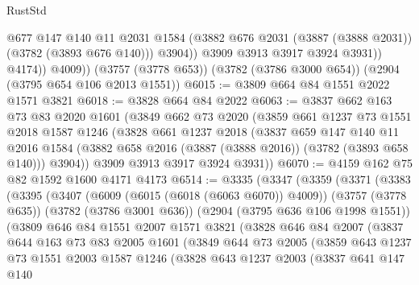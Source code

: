 \begin{lexlean}{RustStd}
\begin{coremodule}
                    @677
                    @147
                    @140
                    @11
                    @2031
                    @1584
                    (@3882 @676 @2031 (@3887 (@3888 @2031)) (@3782 (@3893 @676 @140)))
                    @3904))
                @3909
                @3913
                @3917
                @3924
                @3931))
            @4174))
        @4009))
    (@3757 (@3778 @653))
    (@3782 (@3786 @3000 @654))
    (@2904 (@3795 @654 @106 @2013 @1551))
@6015 := @3809 @664 @84 @1551 @2022 @1571 @3821
@6018 := @3828 @664 @84 @2022
@6063 := @3837
    @662
    @163
    @73
    @83
    @2020
    @1601
    (@3849
      @662
      @73
      @2020
      (@3859
        @661
        @1237
        @73
        @1551
        @2018
        @1587
        @1246
        (@3828
          @661
          @1237
          @2018
          (@3837
            @659
            @147
            @140
            @11
            @2016
            @1584
            (@3882 @658 @2016 (@3887 (@3888 @2016)) (@3782 (@3893 @658 @140)))
            @3904))
        @3909
        @3913
        @3917
        @3924
        @3931))
@6070 := @4159 @162 @75 @82 @1592 @1600 @4171 @4173
@6514 := @3335
    (@3347
      (@3359
        (@3371
          (@3383
            (@3395
              (@3407
                (@6009 (@6015 (@6018 (@6063 @6070)) @4009))
                (@3757 (@3778 @635))
                (@3782 (@3786 @3001 @636))
                (@2904 (@3795 @636 @106 @1998 @1551))
                (@3809
                  @646
                  @84
                  @1551
                  @2007
                  @1571
                  @3821
                  (@3828
                    @646
                    @84
                    @2007
                    (@3837
                      @644
                      @163
                      @73
                      @83
                      @2005
                      @1601
                      (@3849
                        @644
                        @73
                        @2005
                        (@3859
                          @643
                          @1237
                          @73
                          @1551
                          @2003
                          @1587
                          @1246
                          (@3828
                            @643
                            @1237
                            @2003
                            (@3837
                              @641
                              @147
                              @140

\end{coremodule}
\end{lexlean}
